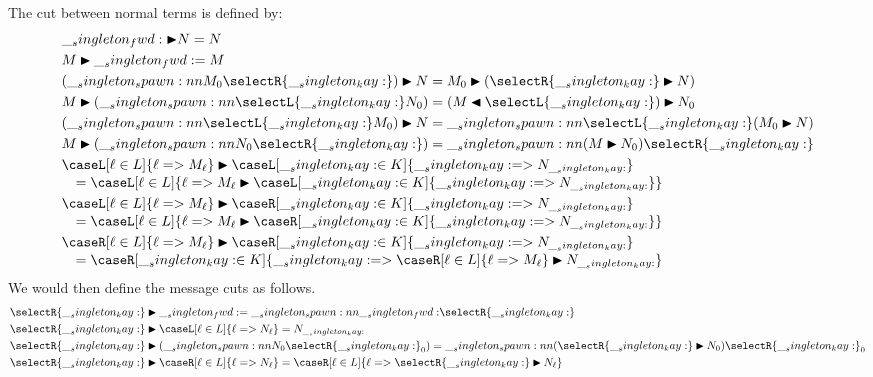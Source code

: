 The cut between normal terms is defined by:
\begin{equation*}
  \begin{lgathered}
    \nspawn{\fwd}{N} = N \\
    \nspawn{M}{\fwd} = M \\
    \nspawn{(\spawn{M_0}{\selectR{\kay}})}{N}
      = \nspawn{M_0}{(\qpspawn{\selectR{\kay}}{N})} \\
    \nspawn{M}{(\spawn{\selectL{\kay}}{N_0})}
      = \nspawn{(\qwspawn{M}{\selectL{\kay}})}{N_0} \\
    \nspawn{(\spawn{\selectL{\kay}}{M_0})}{N}
      = \spawn{\selectL{\kay}}{(\nspawn{M_0}{N})} \\
    \nspawn{M}{(\spawn{N_0}{\selectR{\kay}})}
      = \spawn{(\nspawn{M}{N_0})}{\selectR{\kay}} \\
    \nspawn{\caseL[\ell \in L]{\ell => M_{\ell}}}
           {\caseL[\kay \in K]{\kay => N_{\kay}}} \\[-.75\jot]\quad
      = \caseL[\ell \in L]{\ell =>
          \nspawn{M_{\ell}}{\caseL[\kay \in K]{\kay => N_{\kay}}}} \\
    \nspawn{\caseL[\ell \in L]{\ell => M_{\ell}}}
           {\caseR[\kay \in K]{\kay => N_{\kay}}} \\[-.75\jot]\quad
      = \caseL[\ell \in L]{\ell =>
          \nspawn{M_{\ell}}{\caseR[\kay \in K]{\kay => N_{\kay}}}} \\
    \nspawn{\caseR[\ell \in L]{\ell => M_{\ell}}}
           {\caseR[\kay \in K]{\kay => N_{\kay}}} \\[-.75\jot]\quad
      = \caseR[\kay \in K]{\kay =>
          \nspawn{\caseR[\ell \in L]{\ell => M_{\ell}}}{N_{\kay}}}
  \end{lgathered}
\end{equation*}
We would then define the message cuts as follows.
\begin{equation*}
  \begin{lgathered}
    \qpspawn{\selectR{\kay}}{\fwd} = \spawn{\fwd}{\selectR{\kay}} \\
    \qpspawn{\selectR{\kay}}{\caseL[\ell \in L]{\ell => N_{\ell}}} = N_{\kay} \\
    \qpspawn{\selectR{\kay}}{(\spawn{N_0}{\selectR{\kay}_0})}
      = \spawn{(\qpspawn{\selectR{\kay}}{N_0})}{\selectR{\kay}_0} \\
    \qpspawn{\selectR{\kay}}{\caseR[\ell \in L]{\ell => N_{\ell}}}
      = \caseR[\ell \in L]{\ell => \qpspawn{\selectR{\kay}}{N_{\ell}}} \\
  \end{lgathered}
\end{equation*}
